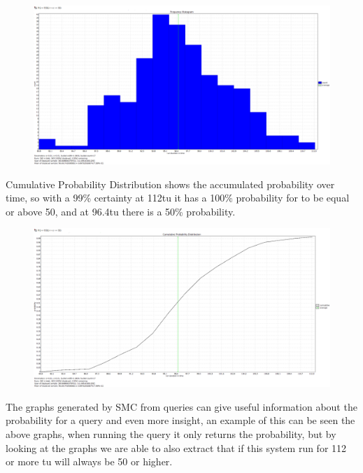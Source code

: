 \begin{figure}[!h]
	\includegraphics[width=\textwidth]{graphics/eq3fh.png}
	\caption{}
	\label{fig:eq3fh}
\end{figure}

Cumulative Probability Distribution shows the accumulated probability over time, so with a 99\% certainty at 112\gls{tu} it has a 100\% probability for  to be equal or above 50, and at 96.4\gls{tu} there is a 50\% probability.

\begin{figure}[!h]
	\includegraphics[width=\textwidth]{graphics/eq3cpd.png}
	\caption{}
	\label{fig:eq3cpd}
\end{figure}

The graphs generated by SMC from queries can give useful information about the probability for a query and even more insight, an example of this can be seen the above graphs, when running the query it only returns the probability, but by looking at the graphs we are able to also extract that if this system run for 112 or more \gls{tu}  will always be 50 or higher.




